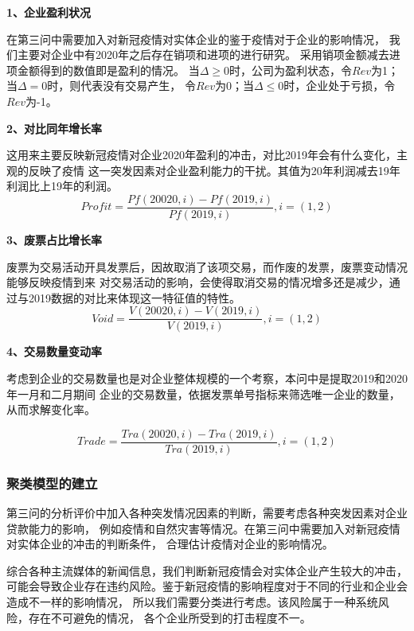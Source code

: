 \documentclass[UTF8]{ctexart}
\begin{document}
\textbf{1、企业盈利状况}

在第三问中需要加入对新冠疫情对实体企业的鉴于疫情对于企业的影响情况，
我们主要对企业中有2020年之后存在销项和进项的进行研究。
采用销项金额减去进项金额得到的数值即是盈利的情况。
当$\Delta \ge 0$时，公司为盈利状态，令$Rev$为1；当$\Delta = 0$时，则代表没有交易产生，
令$Rev$为0；当$\Delta \le 0$时，企业处于亏损，令$Rev$为-1。

\textbf{2、对比同年增长率}

这用来主要反映新冠疫情对企业2020年盈利的冲击，对比2019年会有什么变化，主观的反映了疫情
这一突发因素对企业盈利能力的干扰。其值为20年利润减去19年利润比上19年的利润。
\begin{equation}
	Profit = \frac{Pf(20020,i)-Pf(2019,i)}{Pf(2019,i)},i=(1,2) 
\end{equation}

\textbf{3、废票占比增长率}

废票为交易活动开具发票后，因故取消了该项交易，而作废的发票，废票变动情况能够反映疫情到来
对交易活动的影响，会使得取消交易的情况增多还是减少，通过与2019数据的对比来体现这一特征值的特性。
\begin{equation}
	Void = \frac{V(20020,i)-V(2019,i)}{V(2019,i)},i=(1,2) 
\end{equation}

\textbf{4、交易数量变动率}

考虑到企业的交易数量也是对企业整体规模的一个考察，本问中是提取2019和2020年一月和二月期间
企业的交易数量，依据发票单号指标来筛选唯一企业的数量，从而求解变化率。

\begin{equation}
	Trade = \frac{Tra(20020,i)-Tra(2019,i)}{Tra(2019,i)},i=(1,2) 
\end{equation}


\subsubsection{聚类模型的建立}

第三问的分析评价中加入各种突发情况因素的判断，需要考虑各种突发因素对企业贷款能力的影响，
例如疫情和自然灾害等情况。在第三问中需要加入对新冠疫情对实体企业的冲击的判断条件，
合理估计疫情对企业的影响情况。

综合各种主流媒体的新闻信息，我们判断新冠疫情会对实体企业产生较大的冲击，
可能会导致企业存在违约风险。鉴于新冠疫情的影响程度对于不同的行业和企业会造成不一样的影响情况，
所以我们需要分类进行考虑。该风险属于一种系统风险，存在不可避免的情况，
各个企业所受到的打击程度不一。
\end{document}
